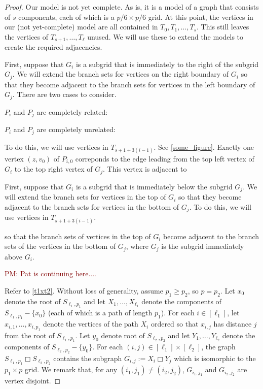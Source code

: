 \documentclass[kpfonts,lotsofwhite]{patmorin}
\newcommand{\boxprod}{\mathbin{\Box}}
\renewcommand{\ge}{\geqslant}
\newcommand{\pat}[1]{\textcolor{Maroon}{PM: #1}}
\theoremstyle{plain}
\theoremstyle{definition}
\begin{document}
\begin{proof}
  Our model is not yet complete.  As is, it is a model of a graph that consists of $s$ components, each of which is a $p/6\times p/6$ grid.  At this point, the vertices in our (not yet-complete) model are all contained in $T_0,T_1,\ldots,T_s$.  This still leaves the vertices of $T_{s+1},\ldots,T_\ell$ unused.  We will use these to extend the models to create the required adjacencies.

  First, suppose that $G_i$ is a subgrid that is immediately to the right of the subgrid $G_j$.  We will extend the branch sets for vertices on the right boundary of $G_i$ so that they become adjacent to the branch sets for vertices in the left boundary of $G_j$. There are two cases to consider.

  \begin{compactitem}
    \item $P_i$ and $P_j$ are completely related:

    \item $P_i$ and $P_j$ are completely unrelated:
  \end{compactitem}




  To do this, we will use vertices in $T_{s+1+3(i-1)}$. See \cref{some_figure}. Exactly one vertex $(z,v_0)$ of $P_{i,0}$ correponds to the edge leading from the top left vertex of $G_i$ to the top right vertex of $G_j$.  This vertex is adjacent to




  First, suppose that $G_i$ is a subgrid that is immediately below the subgrid $G_j$.  We will extend the branch sets for vertices in the top of $G_i$ so that they become adjacent to the branch sets for vertices in the bottom of $G_j$. To do this, we will use vertices in $T_{s+1+3(i-1)}$.



   so that the branch sets of vertices in the top of $G_i$ become adjacent to the branch sets of the vertices in the bottom of $G_j$, where $G_j$ is the subgrid immediately above $G_i$.


  \pat{Pat is continuing here....}


  Refer to \cref{t1xt2}.
  Without loss of generality, assume $p_1\ge p_2$, so $p=p_2$.    Let $x_0$ denote the root of $S_{\ell_1,p_1}$ and let $X_1,\ldots,X_{\ell_1}$ denote the components of $S_{\ell_1,p_1}-\{x_0\}$ (each of which is a path of length  $p_1$).  For each $i\in[\ell_1]$, let $x_{i,1},\ldots,x_{i,p_1}$ denote the vertices of the path $X_i$ ordered so that $x_{i,j}$ has distance $j$ from the root of $S_{\ell_1,p_1}$.   Let $y_0$ denote root of $S_{\ell_2,p_2}$ and let $Y_1,\ldots,Y_{\ell_2}$ denote the components of $S_{\ell_2,p_2}-\{y_0\}$.  For each $(i,j)\in [\ell_1]\times [\ell_2]$, the graph $S_{\ell_1,p_1}\boxprod S_{\ell_2,p_2}$ contains the subgraph $G_{i,j}:=X_i\boxprod Y_j$ which is isomorphic to the $p_1\times p$ grid. We remark that, for any $(i_1,j_1)\neq(i_2,j_2)$, $G_{i_1,j_1}$ and $G_{i_2,j_2}$ are vertex disjoint.


\end{proof}
\end{document}
